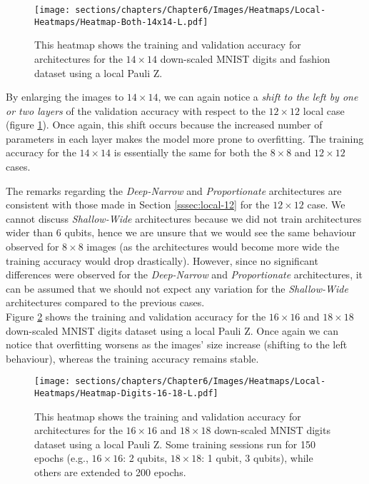 \begin{figure}[h]
    \centering
    \texttt{[image: sections/chapters/Chapter6/Images/Heatmaps/Local-Heatmaps/Heatmap-Both-14x14-L.pdf]}
    \caption{This heatmap shows the training and validation accuracy for architectures for the $14\times14$ down-scaled MNIST digits and fashion dataset using a local Pauli Z.}
    \label{fig:heatmap-14x14-L}
\end{figure}

By enlarging the images to $14\times14$, we can again notice a \textit{shift to the left by 
one or two layers} of the validation accuracy with respect to the $12\times12$ local case (figure 
\ref{fig:heatmap-14x14-L}). Once again, this shift 
occurs because the increased number of parameters in each layer makes the model more prone to overfitting.
The training accuracy for the $14\times14$ is essentially the same for both the $8\times8$ and 
$12\times12$ cases.

The remarks regarding the \textit{Deep-Narrow} and \textit{Proportionate} architectures are consistent 
with those made in Section \ref{sssec:local-12} for the $12\times12$ case.
We cannot discuss \textit{Shallow-Wide} architectures because we did not train architectures wider
than 6 qubits, hence we are unsure that we would see the same behaviour observed for $8\times8$ 
images (as the architectures would become more wide the training accuracy would drop drastically).
However, since no significant differences were observed for the \textit{Deep-Narrow} 
and \textit{Proportionate} architectures, it can be assumed that we should not expect any variation 
for the \textit{Shallow-Wide} architectures compared to the previous cases.\\

Figure \ref{fig:heatmap-16x16-L} shows the training and validation accuracy for the $16\times16$ and 
$18\times18$ down-scaled MNIST digits dataset using a local Pauli Z.
Once again we can notice that overfitting worsens as the images' size increase (shifting to the left behaviour), 
whereas the training accuracy remains stable.

\begin{figure}[h]
    \centering
    \texttt{[image: sections/chapters/Chapter6/Images/Heatmaps/Local-Heatmaps/Heatmap-Digits-16-18-L.pdf]}
    \caption{This heatmap shows the training and validation accuracy for architectures for the $16\times16$ and 
    $18\times18$ down-scaled MNIST digits dataset using a local Pauli Z.
     Some training sessions run for 150 epochs (e.g., $16\times16$: 2 qubits, $18\times18$: 
     1 qubit, 3 qubits), while others are extended to 200 epochs.}
    \label{fig:heatmap-16x16-L}
\end{figure}

